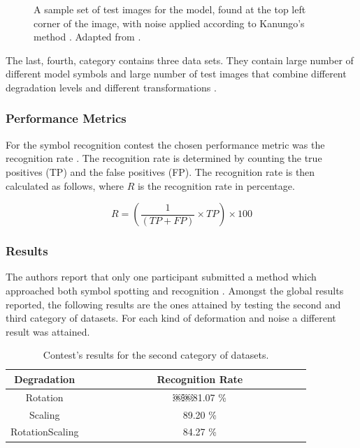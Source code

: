 \begin{figure}[h]
        \centering
        \caption[Sample test images which include noise]{A sample set of test images for the model, found at the top left corner of the image, with noise applied according to Kanungo's method \cite{888707}. Adapted from \cite{Delalandre_contest}.}
        \label{fig:noises}
\end{figure}

The last, fourth, category contains three data sets. They contain large number of different model symbols and large number of test images that combine different degradation levels and different transformations \cite{Delalandre_2012}.

\subsubsection{Performance Metrics}
For the symbol recognition contest the chosen performance metric was the recognition rate \cite{Delalandre_2012}. The recognition rate is determined by counting the true positives (TP) and the false positives (FP). The recognition rate is then calculated as follows, where $R$ is the recognition rate in percentage.

\begin{equation}
    R = \left(\frac{1}{(TP+FP)} \times TP\right) \times 100
\end{equation}

\subsubsection{Results}
The authors report that only one participant submitted a method which approached both symbol spotting and recognition \cite{Nayef}. Amongst the global results reported, the following results are the ones attained by testing the second and third category of datasets. For each kind of deformation and noise a different result was attained. \\

\begin{table}[h]
\centering
\caption{Contest's results for the second category of datasets.}
\begin{tabular}{ccccccccccccccc}
  \hline
      Degradation & & & & & & & & Recognition Rate \\
  \hline
      Rotation & & & & & & & &  ￼￼81.07 \% \\
      Scaling & & & & & & & &  89.20 \% \\
      RotationScaling & & & & & & & &  84.27 \% \\   
  \hline
\end{tabular}
\end{table}


